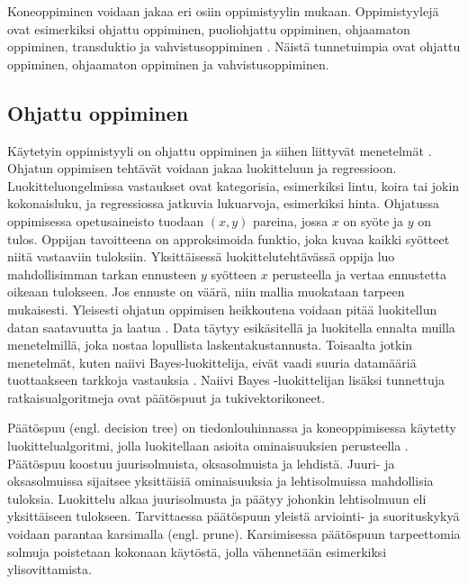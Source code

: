 \documentclass[utf8]{gradu3}
\begin{document}
Koneoppiminen voidaan jakaa eri osiin oppimistyylin mukaan. Oppimistyylejä ovat esimerkiksi ohjattu oppiminen, puoliohjattu oppiminen, ohjaamaton oppiminen, transduktio ja vahvistusoppiminen \parencite{das2017survey}. Näistä tunnetuimpia ovat ohjattu oppiminen, ohjaamaton oppiminen ja vahvistusoppiminen.

\subsection{Ohjattu oppiminen}

Käytetyin oppimistyyli on ohjattu oppiminen ja siihen liittyvät menetelmät \parencite{jordan2015machine,nasteski2017overview}. Ohjatun oppimisen tehtävät voidaan jakaa luokitteluun ja regressioon. Luokitteluongelmissa vastaukset ovat kategorisia, esimerkiksi lintu, koira tai jokin kokonaisluku, ja regressiossa jatkuvia lukuarvoja, esimerkiksi hinta. Ohjatussa oppimisessa opetusaineisto tuodaan \((x,y)\) pareina, jossa \(x\) on syöte ja \(y\) on tulos. Oppijan tavoitteena on approksimoida funktio, joka kuvaa kaikki syötteet niitä vastaaviin tuloksiin. Yksittäisessä luokittelutehtävässä oppija luo mahdollisimman tarkan ennusteen \(y\) syötteen \(x\) perusteella ja vertaa ennustetta oikeaan tulokseen. Jos ennuste on väärä, niin mallia muokataan tarpeen mukaisesti. Yleisesti ohjatun oppimisen heikkoutena voidaan pitää luokitellun datan saatavuutta ja laatua \parencite{das2017survey}. Data täytyy esikäsitellä ja luokitella ennalta muilla menetelmillä, joka nostaa lopullista laskentakustannusta. Toisaalta jotkin menetelmät, kuten naiivi Bayes-luokittelija, eivät vaadi suuria datamääriä tuottaakseen tarkkoja vastauksia \parencite{osisanwo2017supervised}. Naiivi Bayes -luokittelijan lisäksi tunnettuja ratkaisualgoritmeja ovat päätöspuut ja tukivektorikoneet.

Päätöspuu (engl. decision tree) on tiedonlouhinnassa ja koneoppimisessa käytetty luokittelualgoritmi, jolla luokitellaan asioita ominaisuuksien perusteella \parencite{nasteski2017overview,osisanwo2017supervised}. Päätöspuu koostuu juurisolmuista, oksasolmuista ja lehdistä. Juuri- ja oksasolmuissa sijaitsee yksittäisiä ominaisuuksia ja lehtisolmuissa mahdollisia tuloksia. Luokittelu alkaa juurisolmusta ja päätyy johonkin lehtisolmuun eli yksittäiseen tulokseen. Tarvittaessa päätöspuun yleistä arviointi- ja suorituskykyä voidaan parantaa karsimalla (engl. prune). Karsimisessa päätöspuun tarpeettomia solmuja poistetaan kokonaan käytöstä, jolla vähennetään esimerkiksi ylisovittamista.
\end{document}
